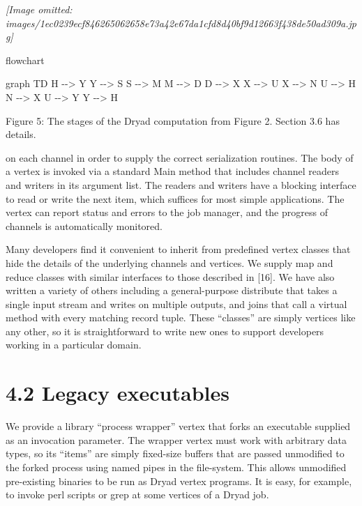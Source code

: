 \documentclass[
]{article}
\newenvironment{Shaded}{}{}
\newcommand{\NormalTok}[1]{#1}
\begin{document}
\textit{[Image omitted: images/1ec0239ecf846265062658e73a42e67da1cfd8d40bf9d12663f438de50ad309a.jpg]}

flowchart

\begin{Shaded}
\begin{Highlighting}[]
\NormalTok{graph TD}
\NormalTok{    H {-}{-}\textgreater{} Y}
\NormalTok{    Y {-}{-}\textgreater{} S}
\NormalTok{    S {-}{-}\textgreater{} M}
\NormalTok{    M {-}{-}\textgreater{} D}
\NormalTok{    D {-}{-}\textgreater{} X}
\NormalTok{    X {-}{-}\textgreater{} U}
\NormalTok{    X {-}{-}\textgreater{} N}
\NormalTok{    U {-}{-}\textgreater{} H}
\NormalTok{    N {-}{-}\textgreater{} X}
\NormalTok{    U {-}{-}\textgreater{} Y}
\NormalTok{    Y {-}{-}\textgreater{} H}
\end{Highlighting}
\end{Shaded}

Figure 5: The stages of the Dryad computation from Figure 2. Section 3.6
has details.

on each channel in order to supply the correct serialization routines.
The body of a vertex is invoked via a standard Main method that includes
channel readers and writers in its argument list. The readers and
writers have a blocking interface to read or write the next item, which
suffices for most simple applications. The vertex can report status and
errors to the job manager, and the progress of channels is automatically
monitored.

Many developers find it convenient to inherit from predefined vertex
classes that hide the details of the underlying channels and vertices.
We supply map and reduce classes with similar interfaces to those
described in {[}16{]}. We have also written a variety of others
including a general-purpose distribute that takes a single input stream
and writes on multiple outputs, and joins that call a virtual method
with every matching record tuple. These ``classes'' are simply vertices
like any other, so it is straightforward to write new ones to support
developers working in a particular domain.

\section{4.2 Legacy executables}\label{legacy-executables}

We provide a library ``process wrapper'' vertex that forks an executable
supplied as an invocation parameter. The wrapper vertex must work with
arbitrary data types, so its ``items'' are simply fixed-size buffers
that are passed unmodified to the forked process using named pipes in
the file-system. This allows unmodified pre-existing binaries to be run
as Dryad vertex programs. It is easy, for example, to invoke perl
scripts or grep at some vertices of a Dryad job.
\end{document}
